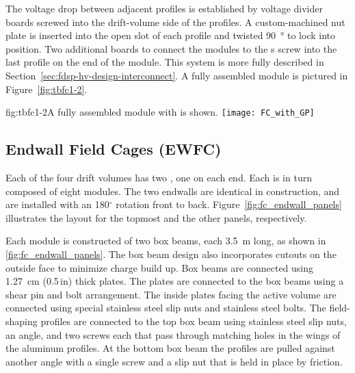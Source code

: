 The voltage drop between adjacent profiles is established by voltage divider boards screwed into the drift-volume side of the profiles. A custom-machined nut plate %
is inserted into the open slot of each profile and twisted \SI{90}{\degree} %
to lock into position. Two additional boards to connect the modules to the s %
screw into the last profile on the  end of the module. This system is %
more fully described in Section~\ref{sec:fdsp-hv-design-interconnect}. A fully assembled module is pictured in Figure~\ref{fig:tbfc1-2}.

\begin{dunefigure}{fig:tbfc1-2}{A fully assembled  module with  is shown.} %
\texttt{[image: FC\_with\_GP]}
\end{dunefigure}


\subsection{Endwall Field Cages (EWFC)}


Each of the four drift volumes has two , one on each end. Each  is in turn composed of eight  modules.  The two endwalls are identical in construction, and are installed with an 180$^\circ$ rotation front to back.
Figure~\ref{fig:fc_endwall_panels} illustrates the layout for the topmost 
and the other panels, respectively.



Each  module is constructed of two  box beams, each \SI{3.5}{\m} long, as shown in \ref{fig:fc_endwall_panels}. 
The box beam design also incorporates cutouts on the outside face to minimize charge build up. Box beams are connected using \SI{1.27}{\cm} (\num{0.5}\,in) thick  plates. The plates are connected to the box beams using a shear pin and bolt arrangement. The inside plates facing the active volume are connected using special stainless steel slip nuts and stainless steel bolts. The field-shaping profiles are connected to the top box beam using stainless steel slip nuts, an  angle, and two screws each that pass through matching holes in the wings of the aluminum profiles. At the bottom box beam the profiles are pulled against another  angle with a single screw and a slip nut that is held in place by friction.

